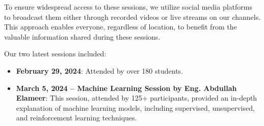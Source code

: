 \documentclass[11pt, twocolumn]{article}
\begin{document}
To ensure widespread access to these sessions, we utilize social media platforms to broadcast them either through recorded videos or live streams on our channels. This approach enables everyone, regardless of location, to benefit from the valuable information shared during these sessions.

Our two latest sessions included:
\begin{itemize}
    \item \textbf{February 29, 2024}: Attended by over 180 students.
    \item \textbf{March 5, 2024 – Machine Learning Session by Eng. Abdullah Elameer}: This session, attended by 125+ participants, provided an in-depth explanation of machine learning models, including supervised, unsupervised, and reinforcement learning techniques.
\end{itemize}
\end{document}
